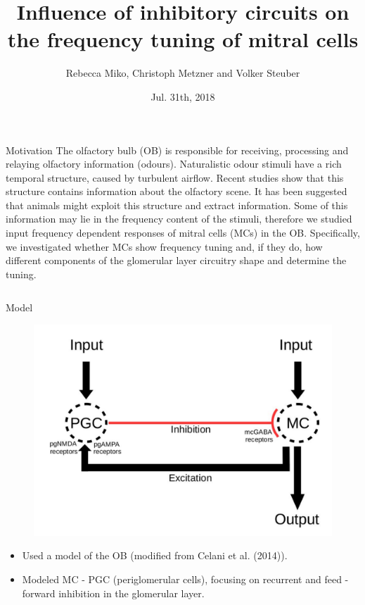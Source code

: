 \documentclass[final,hyperref={pdfpagelabels=false}]{beamer}
\title{Influence of inhibitory circuits on the frequency tuning of mitral cells}
\author[Miko]{Rebecca Miko, Christoph Metzner and Volker Steuber}
\institute{University of Hertfordshire, AL10 9AB, UK}
\date{Jul. 31th, 2018}
\begin{document}
\begin{frame}{} 
\begin{block}{Motivation}
The olfactory bulb (OB) is responsible for receiving, processing and relaying olfactory information (odours). 
Naturalistic odour stimuli have a rich temporal structure, caused by turbulent airflow.
Recent studies show that this structure contains information about the olfactory scene. 
It has been suggested that animals might exploit this structure and extract information. 
Some of this information may lie in the frequency content of the stimuli, therefore we studied input frequency dependent responses of mitral cells (MCs) in the OB.
Specifically, we investigated whether MCs show frequency tuning and, if they do, how different components of the glomerular layer circuitry  shape and determine the tuning.
\end{block}    

\begin{columns}[t]
\begin{column}{.48\linewidth}

\begin{block}{Model} 
\begin{figure}
\center
\includegraphics[scale=0.7]{images/Circuit_Diagram}
\end{figure}
\begin{itemize}
\item Used a model of the OB (modified from Celani et al. (2014)).
\item Modeled MC - PGC (periglomerular cells), focusing on recurrent and feed - forward inhibition in the glomerular layer.
\end{itemize}
\end{block}


\end{column}
\end{columns}
\end{frame}
\end{document}
